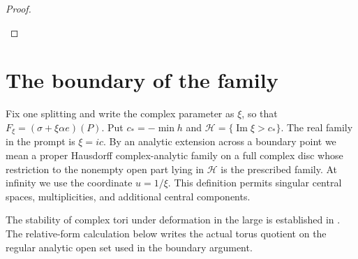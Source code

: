 \begin{proof}
\begin{enumerate}[label=\arabic*.]
\end{enumerate}
\end{proof}


\section{The boundary of the family}

Fix one splitting and write the complex parameter as $\xi$, so that
$F_\xi=(\sigma+\xi\alpha e)(P)$. Put
$c_*=-\min h$ and $\mathcal H=\{\operatorname{Im}\xi>c_*\}$.
The real family in the prompt is $\xi=ic$.
By an analytic extension across a boundary point we mean a proper
Hausdorff complex-analytic family on a full complex disc whose
restriction to the nonempty open part lying in $\mathcal H$ is
the prescribed family. At infinity we use the coordinate $u=1/\xi$.
This definition permits singular central spaces, multiplicities,
and additional central components.

The stability of complex tori under deformation in the large is
established in \cite[definition, p.~261; Theorem 2.1, p.~264]{Catanese2004}.
The relative-form calculation below writes the actual torus quotient
on the regular analytic open set used in the boundary argument.

